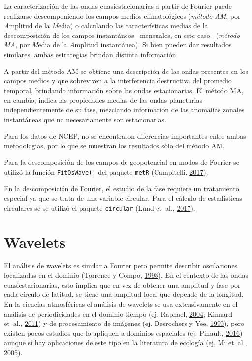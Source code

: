 \documentclass[spanish,a4paper,12pt,oneside]{book}
\begin{document}
La caracterización de las ondas cuasiestacionarias a partir de Fourier
puede realizarse descomponiendo los campos medios climatológicos
(\emph{método AM}, por \emph{A}mplitud de la \emph{M}edia) o calculando
las características medias de la descomposición de los campos
instantáneos --mensuales, en este caso-- (\emph{método MA}, por
\emph{M}edia de la \emph{A}mplitud instantánea). Si bien pueden dar
resultados similares, ambas estrategias brindan distinta información.

A partir del método AM se obtiene una descripción de las ondas presentes
en los campos medios y que sobreviven a la interferencia destructiva del
promedio temporal, brindando información sobre las ondas estacionarias.
El método MA, en cambio, indica las propiedades medias de las ondas
planetarias independientemente de su fase, mezclando información de las
anomalías zonales instantáneas que no necesariamente son estacionarias.

Para los datos de NCEP, no se encontraron diferencias importantes entre
ambas metodologías, por lo que se muestran los resultados sólo del
método AM.

Para la descomposición de los campos de geopotencial en modos de Fourier
se utilizó la función \texttt{FitQsWave()} del paquete \texttt{metR}
(Campitelli, \protect\hyperlink{ref-R-metR}{2017}).

En la descomposición de Fourier, el estudio de la fase requiere un
tratamiento especial ya que se trata de una variable circular. Para el
cálculo de estadísticas circulares se se utilizó el paquete
\texttt{circular} (Lund et~al.,
\protect\hyperlink{ref-R-circular}{2017}).

\section*{Wavelets}

El análisis de wavelets es similar a Fourier pero permite describir
oscilaciones localizadas en el dominio (Torrence y Compo,
\protect\hyperlink{ref-Torrence1998}{1998}). En el contexto de las ondas
cuasiestacionarias, esto implica que en vez de obtener una amplitud y
fase por cada círculo de latitud, se tiene una amplitud local que
depende de la longitud. En la ciencias atmosféricas el análisis de
wavelets se usa extensivamente en el análisis de periodicidades en el
dominio tiempo (ej. Raphael, \protect\hyperlink{ref-Raphael2004}{2004};
Kinnard et~al., \protect\hyperlink{ref-Kinnard2011}{2011}) y de
procesamiento de imágenes (ej. Desrochers y Yee,
\protect\hyperlink{ref-Desrochers1999}{1999}), pero existen pocos
estudios que lo apliquen a dominios espaciales (ej. Pinault,
\protect\hyperlink{ref-Pinault2016}{2016}) aunque sí hay aplicaciones de
este tipo en la literatura de ecología (ej, Mi et~al.,
\protect\hyperlink{ref-Mi2005}{2005}).
\end{document}
